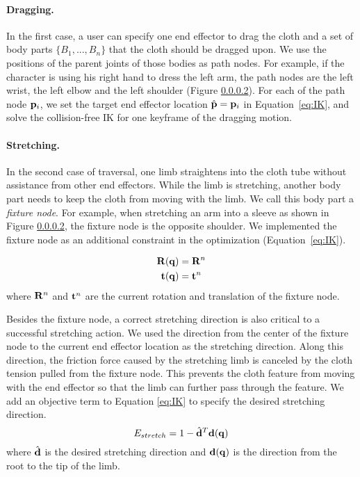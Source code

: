 \paragraph{Dragging.} In the first case, a user can specify one end effector to drag the cloth and a set of body parts $\{B_1 ,..., B_n\}$ that the cloth should be dragged upon. We use the positions of the parent joints of those bodies as path nodes. For example, if the character is using his right hand to dress the left arm, the path nodes are the left wrist, the left elbow and the left shoulder (Figure \ref{}). For each of the path node $\mathbf{p}_i$, we set the target end effector location $\hat{\mathbf{p}}=\mathbf{p}_i$ in Equation~\ref{eq:IK}, and solve the collision-free IK for one keyframe of the dragging motion. 

\paragraph{Stretching.} In the second case of traversal, one limb straightens into the cloth tube without assistance from other end effectors. While the limb is stretching, another body part needs to keep the cloth from moving with the limb. We call this body part a \emph{fixture node}. For example, when stretching an arm into a sleeve as shown in Figure \ref{}, the fixture node is the opposite shoulder. We implemented the fixture node as an additional constraint in the optimization (Equation~\ref{eq:IK}).

\begin{align}
  \label{eq:fixtureNode}
  \mathbf{R}(\mathbf{q})& = \mathbf{R}^n\\
  \nonumber  \mathbf{t}(\mathbf{q})& = \mathbf{t}^n
\end{align}
where $\mathbf{R}^n$ and $\mathbf{t}^n$ are the current rotation and translation of the fixture node.

Besides the fixture node, a correct stretching direction is also critical to a successful stretching action. We used the direction from the center of the fixture node to the current end effector location as the stretching direction. Along this direction, the friction force caused by the stretching limb is canceled by the cloth tension pulled from the fixture node. This prevents the cloth feature from moving with the end effector so that the limb can further pass through the feature. We add an objective term to Equation \ref{eq:IK} to specify the desired stretching direction.
\begin{equation}
  E_{stretch} = 1 - \hat{\mathbf{d}}^T\mathbf{d(q)}
  \label{eq:stretching}
\end{equation}
where $\hat{\mathbf{d}}$ is the desired stretching direction and $\mathbf{d(q)}$ is the direction from the root to the tip of the limb.

